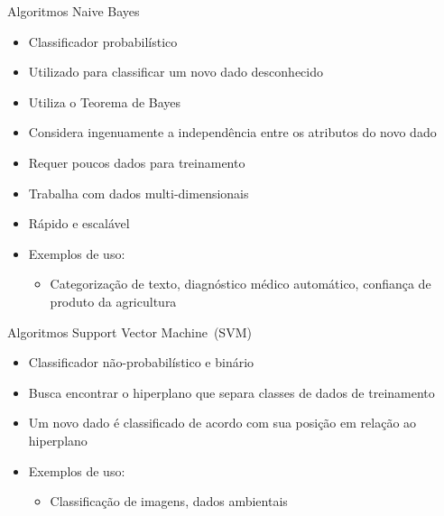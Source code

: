 \documentclass[t]{beamer}
\begin{document}
\begin{frame}{Algoritmos}
Naive Bayes
\begin{itemize}
	\item Classificador probabilístico
	\item Utilizado para classificar um novo dado desconhecido
	\item Utiliza o Teorema de Bayes
	\item Considera ingenuamente a independência entre os atributos do novo dado
	\item Requer poucos dados para treinamento
	\item Trabalha com dados multi-dimensionais
	\item Rápido e escalável
	\item Exemplos de uso:
	\begin{itemize}
		\item Categorização de texto, diagnóstico médico automático, confiança de produto da agricultura
	\end{itemize}
\end{itemize}
\end{frame}

\begin{frame}{Algoritmos}
Support Vector Machine~(SVM)
\begin{itemize}
	\item Classificador não-probabilístico e binário
	\item Busca encontrar o hiperplano que separa classes de dados de treinamento
	\item Um novo dado é classificado de acordo com sua posição em relação ao hiperplano
	\item Exemplos de uso:
	\begin{itemize}
		\item Classificação de imagens, dados ambientais
	\end{itemize}
\end{itemize}
\end{frame}


\frame{\titlepage}
\end{document}
